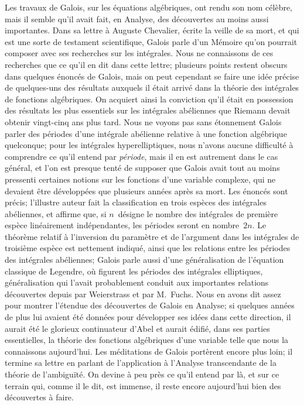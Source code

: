 \documentclass[leqno,12pt]{book}[2005/09/16]
\begin{document}
Les travaux de Galois, sur les équations algébriques, ont
rendu son nom célèbre, mais il semble qu'il avait fait, en
Analyse, des découvertes au moins aussi importantes. Dans
sa lettre à Auguste Chevalier, écrite la veille de sa mort, et
qui est une sorte de testament scientifique, Galois parle d'un
Mémoire qu'on pourrait composer avec ses recherches sur
les intégrales. Nous ne connaissons de ces recherches que ce
qu'il en dit dans cette lettre; plusieurs points restent obscurs
dans quelques énoncés de Galois, mais on peut cependant se
faire une idée précise de quelques-uns des résultats auxquels
il était arrivé dans la théorie des intégrales de fonctions algébriques.
On acquiert ainsi la conviction qu'il était en possession
des résultats les plus essentiels sur les intégrales abéliennes
que Riemann devait obtenir vingt-cinq ans plus tard.
Nous ne voyons pas sans étonnement Galois parler des périodes
d'une intégrale abélienne relative à une fonction
algébrique quelconque; pour les intégrales hyperelliptiques,
nous n'avons aucune difficulté à comprendre ce qu'il entend
par \emph{période}, mais il en est autrement dans le cas général, et
l'on est presque tenté de supposer que Galois avait tout au
moins pressenti certaines notions sur les fonctions d'une variable
complexe, qui ne devaient être développées que plusieurs
années après sa mort. Les énoncés sont précis;
l'illustre auteur fait la classification en trois espèces des intégrales
abéliennes, et affirme que, si $n$~désigne le nombre des
intégrales de première espèce linéairement indépendantes,
les périodes seront en nombre~$2n$. Le théorème relatif à
l'inversion du paramètre et de l'argument dans les intégrales
de troisième espèce est nettement indiqué, ainsi que
les relations entre les périodes des intégrales abéliennes;
Galois parle aussi d'une généralisation de l'équation classique
de Legendre, où figurent les périodes des intégrales
elliptiques, généralisation qui l'avait probablement conduit
aux importantes relations découvertes depuis par
Weierstrass et par M.~Fuchs. Nous en avons dit assez pour
montrer l'étendue des découvertes de Galois en Analyse;
si quelques années de plus lui avaient été données pour développer
ses idées dans cette direction, il aurait été le glorieux
continuateur d'Abel et aurait édifié, dans ses parties
essentielles, la théorie des fonctions algébriques d'une
variable telle que nous la connaissons aujourd'hui. Les
méditations de Galois portèrent encore plus loin; il termine
sa lettre en parlant de l'application à l'Analyse transcendante
de la théorie de l'ambiguïté. On devine à peu près
ce qu'il entend par là, et sur ce terrain qui, comme il le dit,
est immense, il reste encore aujourd'hui bien des découvertes
à faire.
\end{document}
